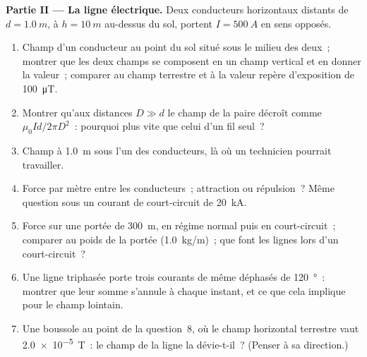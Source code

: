 \begin{problem}
\medskip
\noindent\textbf{Partie II --- La ligne électrique.}
Deux conducteurs horizontaux distants de $d = \qty{1.0}{m}$, à $h = \qty{10}{m}$
au-dessus du sol, portent $I = \qty{500}{A}$ en sens opposés.
\begin{enumerate}[resume]
  \item Champ d'un conducteur au point du sol situé sous le milieu des deux~;
        montrer que les deux champs se composent en un champ vertical et en
        donner la valeur~; comparer au champ terrestre et à la valeur repère
        d'exposition de \qty{100}{\micro T}.
  \item Montrer qu'aux distances $D \gg d$ le champ de la paire décroît comme
        $\mu_0Id/2\pi D^2$~: pourquoi plus vite que celui d'un fil seul~?
  \item Champ à \qty{1.0}{m} sous l'un des conducteurs, là où un technicien
        pourrait travailler.
  \item Force par mètre entre les conducteurs~; attraction ou répulsion~?
        Même question sous un courant de court-circuit de \qty{20}{kA}.
  \item Force sur une portée de \qty{300}{m}, en régime normal puis en
        court-circuit~; comparer au poids de la portée (\qty{1.0}{kg/m})~; que
        font les lignes lors d'un court-circuit~?
  \item Une ligne triphasée porte trois courants de même  déphasés de
        \qty{120}{\degree}~: montrer que leur somme s'annule à chaque instant,
        et ce que cela implique pour le champ lointain.
  \item Une boussole au point de la question~8, où le champ horizontal
        terrestre vaut \qty{2.0e-5}{T}~: le champ de la ligne la
        dévie-t-il~? (Penser à sa direction.)
\end{enumerate}


\end{problem}
